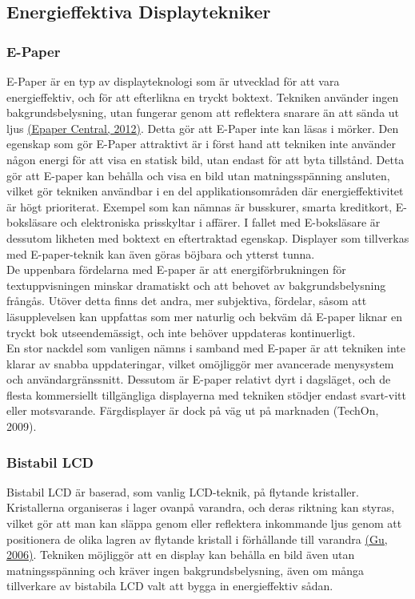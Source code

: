 \documentclass[a4paper,11pt]{article}
\begin{document}
\subsection{Energieffektiva Displaytekniker}

\subsubsection{E-Paper}
E-Paper är en typ av displayteknologi som är utvecklad för att vara energieffektiv, och för att efterlikna en tryckt boktext. Tekniken använder ingen bakgrundsbelysning, utan fungerar genom att reflektera snarare än att sända ut ljus \hyperref[epapercentral]{(Epaper Central, 2012)}. Detta gör att E-Paper inte kan läsas i mörker. Den egenskap som gör E-Paper attraktivt är i först hand att tekniken inte använder någon energi för att visa en statisk bild, utan endast för att byta tillstånd. Detta gör att E-paper kan behålla och visa en bild utan matningsspänning ansluten, vilket gör tekniken användbar i en del applikationsområden där energieffektivitet är högt prioriterat. Exempel som kan nämnas är busskurer, smarta kreditkort, E-boksläsare och elektroniska prisskyltar i affärer. I fallet med E-boksläsare är dessutom likheten med boktext en eftertraktad egenskap. Displayer som tillverkas med E-paper-teknik kan även göras böjbara och ytterst tunna. \\

De uppenbara fördelarna med E-paper är att energiförbrukningen för textuppvisningen minskar dramatiskt och att behovet av bakgrundsbelysning frångås. Utöver detta finns det andra, mer subjektiva, fördelar, såsom att läsupplevelsen kan uppfattas som mer naturlig och bekväm då E-paper liknar en tryckt bok utseendemässigt, och inte behöver uppdateras kontinuerligt. \\

En stor nackdel som vanligen nämns i samband med E-paper är att tekniken inte klarar av snabba uppdateringar, vilket omöjliggör mer avancerade menysystem och användargränssnitt. Dessutom är E-paper relativt dyrt i dagsläget, och de flesta kommersiellt tillgängliga displayerna med tekniken stödjer endast svart-vitt eller motsvarande. Färgdisplayer är dock på väg ut på marknaden (TechOn, 2009).

\subsubsection{Bistabil LCD}
Bistabil LCD är baserad, som vanlig LCD-teknik, på flytande kristaller. Kristallerna organiseras i lager ovanpå varandra, och deras riktning kan styras, vilket gör att man kan släppa genom eller reflektera inkommande ljus genom att positionera de olika lagren av flytande kristall i förhållande till varandra \hyperref[mingu]{(Gu, 2006)}. Tekniken möjliggör att en display kan behålla en bild även utan matningsspänning och kräver ingen bakgrundsbelysning, även om många tillverkare av bistabila LCD valt att bygga in energieffektiv sådan.\\
\end{document}

